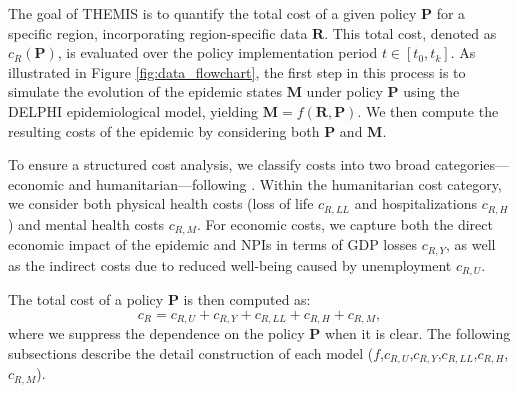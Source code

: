 \documentclass[msom,blindrev]{informs3} %
\begin{document}
\begin{table}[h!]
\centering
{}
\caption{Example Policy}
\label{tab:example_policy}
\end{table}
The goal of THEMIS is to quantify the total cost of a given policy $\bm{P}$ for a specific region, incorporating region-specific data $\bm{R}$. This total cost, denoted as $c_R(\bm{P})$, is evaluated over the policy implementation period $t \in [t_0,t_k]$. As illustrated in Figure \ref{fig:data_flowchart}, the first step in this process is to simulate the evolution of the epidemic states $\bm{M}$ under policy $\bm{P}$ using the DELPHI epidemiological model, yielding $\bm{M} = f(\bm{R},\bm{P})$. We then compute the resulting costs of the epidemic by considering both $\bm{P}$ and $\bm{M}$.

To ensure a structured cost analysis, we classify costs into two broad categories—economic and humanitarian—following \cite{cutler2020covid}. Within the humanitarian cost category, we consider both physical health costs (loss of life $c_{R,LL}$ and hospitalizations $c_{R,H}$) and mental health costs $c_{R,M}$. For economic costs, we capture both the direct economic impact of the epidemic and NPIs in terms of GDP losses $c_{R,Y}$, as well as the indirect costs due to reduced well-being caused by unemployment $c_{R,U}$. 

The total cost of a policy $\bm{P}$ is then computed as:
\[c_R=c_{R,U} + c_{R,Y} + c_{R,LL} + c_{R,H} + c_{R,M},\]
where we suppress the dependence on the policy $\bm{P}$ when it is clear. The following subsections describe the detail construction of each model ($f$,$c_{R,U}$,$c_{R,Y}$,$c_{R,LL}$,$c_{R,H}$,$c_{R,M}$). 
\end{document}
